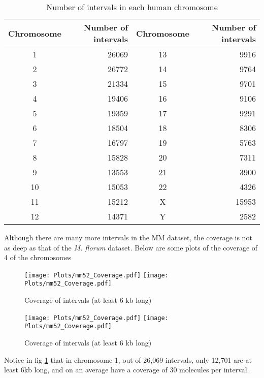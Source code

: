 \begin{table}[H]
\centering
\begin{tabular}{c | r || c | r}
  \hline
  \hline
  Chromosome & Number of intervals & Chromosome & Number of intervals \\ 
  \hline
  1 & 26069  & 13 & 9916 \\
  2 & 26772  & 14 & 9764 \\
  3 & 21334  & 15 & 9701 \\
  4 & 19406  & 16 & 9106 \\
  5 & 19359  & 17 & 9291 \\
  6 & 18504  & 18 & 8306 \\
  7 & 16797  & 19 & 5763 \\
  8 & 15828  & 20 & 7311 \\
  9 & 13553  & 21 & 3900 \\
  10 & 15053  & 22 & 4326 \\
  11 & 15212  & X & 15953 \\
  12 & 14371  & Y & 2582 \\
  \hline
  \hline
\end{tabular}
\caption{Number of intervals in each human chromosome}
\label{tab:mm52intervals}
\end{table}
Although there are many more intervals in the MM dataset, the coverage is not as deep as that of the {\emph{M. florum}} dataset. Below are some plots of the coverage of 4 of the chromosomes
\begin{figure}[H]
\begin{center}
\texttt{[image: Plots/mm52\_Coverage.pdf]}
\texttt{[image: Plots/mm52\_Coverage.pdf]}
\end{center}
\caption{Coverage of intervals (at least 6 kb long)}
\label{fig:Coverage_mm1}
\end{figure}

\begin{figure}[H]
\begin{center}
\texttt{[image: Plots/mm52\_Coverage.pdf]}
\texttt{[image: Plots/mm52\_Coverage.pdf]}
\end{center}
\caption{Coverage of intervals (at least 6 kb long)}
\label{fig:Coverage_mm2}
\end{figure}

Notice in fig \ref{fig:Coverage_mm1} that in chromosome 1, out of 26,069 intervals, only 12,701 are at least 6kb long, and on an average have a coverage of 30 molecules per interval.

